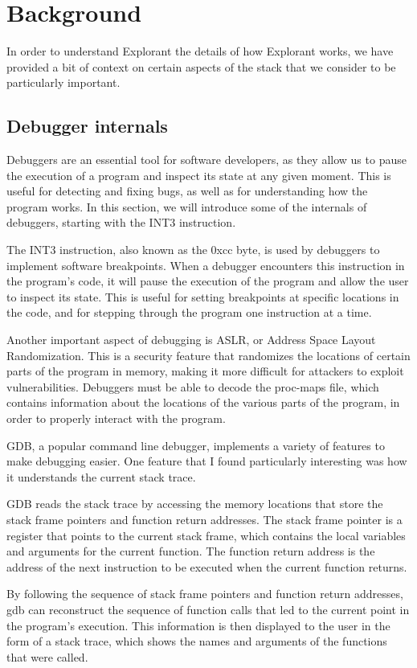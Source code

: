 \chapter{Background}
In order to understand Explorant the details of how Explorant works, we have provided a bit of context on certain aspects of the stack that we consider to be particularly important.

\section{Debugger internals}
Debuggers are an essential tool for software developers, as they allow us to pause the execution of a program and inspect its state at any given moment. This is useful for detecting and fixing bugs, as well as for understanding how the program works. In this section, we will introduce some of the internals of debuggers, starting with the INT3 instruction.

The INT3 instruction, also known as the 0xcc byte, is used by debuggers to implement software breakpoints. When a debugger encounters this instruction in the program's code, it will pause the execution of the program and allow the user to inspect its state. This is useful for setting breakpoints at specific locations in the code, and for stepping through the program one instruction at a time.

Another important aspect of debugging is ASLR, or Address Space Layout Randomization. This is a security feature that randomizes the locations of certain parts of the program in memory, making it more difficult for attackers to exploit vulnerabilities. Debuggers must be able to decode the proc-maps file, which contains information about the locations of the various parts of the program, in order to properly interact with the program.

GDB, a popular command line debugger, implements a variety of features to make debugging easier. One feature that I found particularly interesting was how it understands the current stack trace.

GDB reads the stack trace by accessing the memory locations that store the stack frame pointers and function return addresses. The stack frame pointer is a register that points to the current stack frame, which contains the local variables and arguments for the current function. The function return address is the address of the next instruction to be executed when the current function returns.

By following the sequence of stack frame pointers and function return addresses, gdb can reconstruct the sequence of function calls that led to the current point in the program's execution. This information is then displayed to the user in the form of a stack trace, which shows the names and arguments of the functions that were called.

